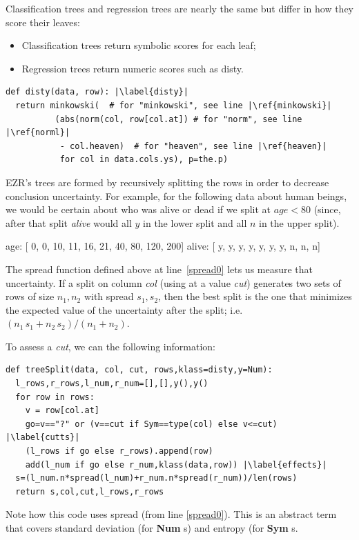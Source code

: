 \documentclass[AMA,STIX2COL]{WileyNJDv5}
\newcommand{\cls}[1]{%
  \setlength{\fboxsep}{1.5pt}%
  \colorbox{clsbg}{\sffamily\bfseries{#1}}%
}
\begin{document}
{ Classification trees and regression trees are nearly the same
but differ  in how they score  their leaves:
 \begin{itemize}
 \item Classification trees return symbolic   scores
 for each leaf;
 \item Regression trees return numeric scores such as \textsf{disty}.
 \end{itemize}
\begin{verbatim}
def disty(data, row): |\label{disty}| 
  return minkowski(  # for "minkowski", see line |\ref{minkowski}|
          (abs(norm(col, row[col.at]) # for "norm", see line |\ref{norml}|
           - col.heaven)  # for "heaven", see line |\ref{heaven}|
           for col in data.cols.ys), p=the.p)
\end{verbatim}       
EZR's   trees are formed by recursively splitting the rows in order
 to decrease conclusion uncertainty. 
 For example,   for the following data about human beings,
 we would be certain about who was alive or dead if we split
 at   $\mathit{age}<80$
 (since, after that split {\em alive} would all $y$
 in the lower split and all $n$ in the upper split).
 \begin{repl}
 age:   [ 0, 0, 10, 11, 16, 21, 40, 80, 120, 200]
 alive: [ y, y,  y,  y,  y,  y,  y,  n,   n,   n]
\end{repl}
The \textsf{spread} function defined above at line~\ref{spread0} lets us
measure that uncertainty.
If a split on column {\em col} (using at a value {\em cut}) generates two sets of rows of
size $n_1,n_2$ with \textsf{spread} $s_1,s_2$, then the best split is
the one that minimizes the expected value of the uncertainty after
the split; i.e. $(n_1\, s_1 + n_2\, s_2)/(n_1 + n_2)$.

To assess a {\em cut},
we can the following information:
\begin{verbatim}
def treeSplit(data, col, cut, rows,klass=disty,y=Num): 
  l_rows,r_rows,l_num,r_num=[],[],y(),y()
  for row in rows:
    v = row[col.at]
    go=v=="?" or (v==cut if Sym==type(col) else v<=cut) |\label{cutts}|
    (l_rows if go else r_rows).append(row)
    add(l_num if go else r_num,klass(data,row)) |\label{effects}|
  s=(l_num.n*spread(l_num)+r_num.n*spread(r_num))/len(rows)
  return s,col,cut,l_rows,r_rows
\end{verbatim}
Note how this code  uses  \textsf{spread} (from line \ref{spread0}). This is an abstract term
that covers standard deviation (for \cls{Num}s) and entropy (for \cls{Sym}s.

}
\end{document}
